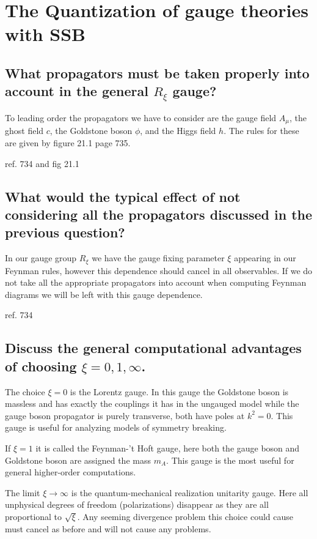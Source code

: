 \documentclass[paper=a4, fontsize=11pt]{scrartcl} %
\numberwithin{equation}{section} %
\numberwithin{figure}{section} %
\numberwithin{table}{section} %
\begin{document}
\section{The Quantization of gauge theories with SSB}

\subsection{What propagators must be taken properly into account in the general $R_{\xi}$ gauge?}

To leading order the propagators we have to consider are the gauge field $A_{\mu}$, the ghost field $c$, the Goldstone boson $\phi$, and the Higgs field $h$. The rules for these are given by figure 21.1 page 735. 

ref. 734 and fig 21.1

\subsection{What would the typical effect of not considering all the propagators discussed in the previous question?}

In our gauge group $R_{\xi}$ we have the gauge fixing parameter $\xi$ appearing in our Feynman rules, however this dependence should cancel in all observables. If we do not take all the appropriate propagators into account when computing Feynman diagrams we will be left with this gauge dependence. 

ref. 734

\subsection{Discuss the general computational advantages of choosing $\xi = 0 , 1, \infty$.}

The choice $\xi = 0$ is the Lorentz gauge. In this gauge the Goldstone boson is massless and has exactly the couplings it has in the ungauged model while the gauge boson propagator is purely transverse, both have poles at $k^2 = 0 $. This gauge is useful for analyzing models of symmetry breaking. 

If $\xi = 1$ it is called the Feynman-'t Hoft gauge, here both the gauge boson and Goldstone boson are assigned the mass $m_A$. This gauge is the most useful for general higher-order computations. 

The limit $\xi \rightarrow \infty$ is the quantum-mechanical realization unitarity gauge. Here all unphysical degrees of freedom (polarizations) disappear as they are all proportional to $\sqrt{\xi}$. Any seeming divergence problem this choice could cause must cancel as before and will not cause any problems.
\end{document}
